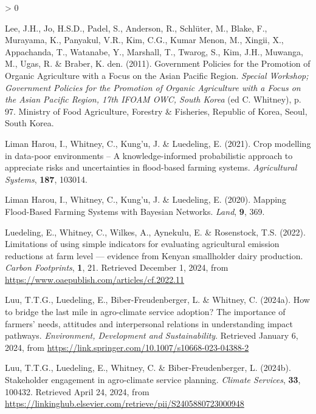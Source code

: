 \documentclass[
]{article}
\newlength{\cslhangindent}
\newenvironment{CSLReferences}[2] %
 {%
  \setlength{\parindent}{0pt}
  \ifodd #1 \everypar{\setlength{\hangindent}{\cslhangindent}}\ignorespaces\fi
  \ifnum #2 > 0
  \setlength{\parskip}{#2\baselineskip}
  \fi
 }%
 {}
\begin{document}
\begin{CSLReferences}{1}{0}
\leavevmode{}%
Lee, J.H., Jo, H.S.D., Padel, S., Anderson, R., Schlüter, M., Blake, F.,
Murayama, K., Panyakul, V.R., Kim, C.G., Kumar Menon, M., Xingii, X.,
Appachanda, T., Watanabe, Y., Marshall, T., Twarog, S., Kim, J.H.,
Muwanga, M., Ugas, R. \& Braber, K. den. (2011). Government {Policies}
for the {Promotion} of {Organic} {Agriculture} with a {Focus} on the
{Asian} {Pacific} {Region}. \emph{Special {Workshop}; {Government}
{Policies} for the {Promotion} of {Organic} {Agriculture} with a {Focus}
on the {Asian} {Pacific} {Region}, 17th {IFOAM} {OWC}, {South} {Korea}}
(ed C. Whitney), p. 97. Ministry of Food Agriculture, Forestry \&
Fisheries, Republic of Korea, Seoul, South Korea.

\leavevmode{}%
Liman Harou, I., Whitney, C., Kung'u, J. \& Luedeling, E. (2021). Crop
modelling in data-poor environments -- {A} knowledge-informed
probabilistic approach to appreciate risks and uncertainties in
flood-based farming systems. \emph{Agricultural Systems}, \textbf{187},
103014.

\leavevmode{}%
Liman Harou, I., Whitney, C., Kung'u, J. \& Luedeling, E. (2020).
Mapping {Flood}-{Based} {Farming} {Systems} with {Bayesian} {Networks}.
\emph{Land}, \textbf{9}, 369.

\leavevmode{}%
Luedeling, E., Whitney, C., Wilkes, A., Aynekulu, E. \& Rosenstock, T.S.
(2022). Limitations of using simple indicators for evaluating
agricultural emission reductions at farm level --- evidence from
{Kenyan} smallholder dairy production. \emph{Carbon Footprints},
\textbf{1}, 21. Retrieved December 1, 2024, from
\url{https://www.oaepublish.com/articles/cf.2022.11}

\leavevmode{}%
Luu, T.T.G., Luedeling, E., Biber-Freudenberger, L. \& Whitney, C.
(2024a). How to bridge the last mile in agro-climate service adoption?
{The} importance of farmers' needs, attitudes and interpersonal
relations in understanding impact pathways. \emph{Environment,
Development and Sustainability}. Retrieved January 6, 2024, from
\url{https://link.springer.com/10.1007/s10668-023-04388-2}

\leavevmode{}%
Luu, T.T.G., Luedeling, E., Whitney, C. \& Biber-Freudenberger, L.
(2024b). Stakeholder engagement in agro-climate service planning.
\emph{Climate Services}, \textbf{33}, 100432. Retrieved April 24, 2024,
from
\url{https://linkinghub.elsevier.com/retrieve/pii/S2405880723000948}


\end{CSLReferences}
\end{document}
